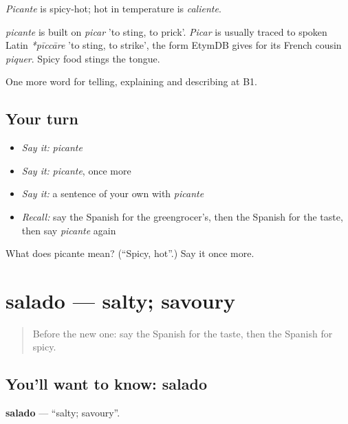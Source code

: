 \emph{Picante} is spicy-hot; hot in temperature is \emph{caliente}.

\begin{cousinweb}
\emph{picante} is built on \emph{picar} 'to sting, to prick'. \emph{Picar} is usually traced to spoken Latin \emph{*pīccāre} 'to sting, to strike', the form EtymDB gives for its French cousin \emph{piquer}. Spicy food stings the tongue.
\end{cousinweb}

\begin{grammarlens}[title={What you've built}]
One more word for telling, explaining and describing at B1.
\end{grammarlens}

\subsection*{Your turn}
\begin{itemize}
\raggedright
  \item \emph{Say it:} \emph{picante}
  \item \emph{Say it:} \emph{picante}, once more
  \item \emph{Say it:} a sentence of your own with \emph{picante}
  \item \emph{Recall:} say the Spanish for the greengrocer's, then the Spanish for the taste, then say \emph{picante} again
\end{itemize}

\begin{tcolorbox}[breakable,colback=teal!4,colframe=teal!35!black,title={Before you move on}]
What does picante mean? (\textquotedblleft{}Spicy, hot\textquotedblright{}.) Say it once more.
\end{tcolorbox}
\section[salado]{salado — salty; savoury}

\label{lesson:ES-C771-salado}



\begin{quote}
Before the new one: say the Spanish for the taste, then the Spanish for spicy.
\end{quote}

\subsection*{You'll want to know: salado}
\textbf{salado} — \textquotedblleft{}salty; savoury\textquotedblright{}.

